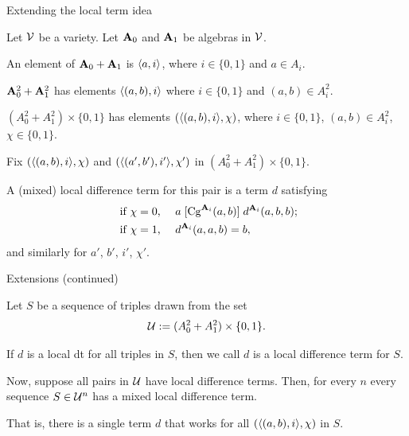 \documentclass[notes=hide,12pt,xcolor=dvipsnames%
   ]{beamer}
\renewcommand{\defn}[1]{\alert{#1}}
\newcommand{\defin}[1]{\alert{#1}}
\theoremstyle{definition}
\begin{document}
\begin{frame}[label=extensions]{Extending the local term idea}

Let $\mathcal{V}$ be a variety.
Let $\mathbf{A}_0$ and  $\mathbf{A}_1$ be algebras in $\mathcal{V}$.

An element of $\mathbf{A}_0 + \mathbf{A}_1$ is $\langle a, i\rangle$,
where $i\in \{0,1\}$ and $a \in A_i$.

$\mathbf{A}_0^2 + \mathbf{A}_1^2$ has elements
$\langle(a,b), i\rangle$ where $i\in \{0,1\}$ and $(a,b) \in A_i^2$.

$(A_0^2 + A_1^2) \times \{0,1\}$
has elements $(\langle(a,b), i\rangle, \chi)$, where $i\in \{0,1\}$, $(a,b) \in A_i^2$,
$\chi\in \{0,1\}$. 

Fix $(\langle(a, b),i\rangle, \chi)$ and $(\langle(a', b'),i'\rangle, \chi')$ in
$(A_0^2 + A_1^2) \times \{0,1\}$.

A (mixed) \defn{local difference term} for this pair is a term $d$ satisfying
\begin{align*}
  \text{ if $\chi=0$,  }\quad & a \mathrel{[\operatorname{Cg}^{\mathbf{A}_i}(a,b)]} d^{\mathbf{A}_i}(a,b,b);\\
  \text{ if $\chi=1$,  }\quad &d^{\mathbf{A}_i}(a,a,b) = b,
\end{align*}
and similarly for $a'$, $b'$, $i'$, $\chi'$.
\end{frame}


\begin{frame}[label=extensions]{Extensions (continued)}

  Let $S$ be a sequence of triples drawn from the set
  \[
  \mathcal{U} := (A_0^2 + A_1^2) \times \{0,1\}.
  \]

  If $d$ is a local dt for all triples in $S$,
  then we call $d$ is a \defin{local difference term for $S$}.


  Now, suppose all pairs in $\mathcal{U}$ have local difference terms.
  Then, for every $n$
  every sequence $S\in \mathcal{U}^n$ has a mixed local difference term.

  That is, there is a single term $d$ that works
  for all $(\langle(a, b), i\rangle,\chi)$ in $S$.
\end{frame}
\end{document}
